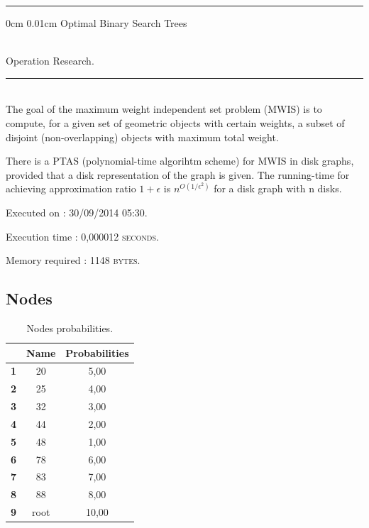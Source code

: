 \documentclass{article}
\makeatletter
\newcommand{\HRule}{\noindent\rule{\linewidth}{0.5mm}}
\renewcommand\section{\@startsection
  {section}{1}{0mm}%
  {0cm}%
  {0.01cm}%
  {\Huge\bfseries\color{black}}}%
\makeatother
\begin{document}
\HRule

\section{Optimal Binary Search Trees}

 \\[0.4cm]
{\LARGE Operation Research.}\\[0.4cm]
\HRule \\[0.5cm]
\indent The goal of the maximum weight independent set problem (MWIS) is to compute, for a given set of geometric objects with certain weights, a subset of disjoint (non-overlapping) objects with maximum total weight.

There is a PTAS (polynomial-time algorihtm scheme) for MWIS in disk graphs, provided that a disk representation of the graph is given. 
The running-time for achieving approximation ratio $1+\epsilon$ 
is $n^{O(1/\epsilon^{2})}$ for a disk graph with n disks.\\[0.5cm]
\begin{compactitem}
\item Executed on : \textsc{30/09/2014 05:30}. 
\item Execution time : \textsc{0,000012 seconds}. 
\item Memory required : \textsc{1148 bytes}. 
\end{compactitem}

\subsection{Nodes}
\begin{table}[!ht]
\centering
\begin{tabular}{c||c|c|}
\cline{2-3}
 & \cellcolor{gray90}\textbf{Name} & \cellcolor{gray90}\textbf{Probabilities}  \\
\hline\hline
\multicolumn{1}{|c||}{\cellcolor{gray90}\textbf{1}} & 20 & 5,00 \\ \hline
\multicolumn{1}{|c||}{\cellcolor{gray90}\textbf{2}} & 25 & 4,00 \\ \hline
\multicolumn{1}{|c||}{\cellcolor{gray90}\textbf{3}} & 32 & 3,00 \\ \hline
\multicolumn{1}{|c||}{\cellcolor{gray90}\textbf{4}} & 44 & 2,00 \\ \hline
\multicolumn{1}{|c||}{\cellcolor{gray90}\textbf{5}} & 48 & 1,00 \\ \hline
\multicolumn{1}{|c||}{\cellcolor{gray90}\textbf{6}} & 78 & 6,00 \\ \hline
\multicolumn{1}{|c||}{\cellcolor{gray90}\textbf{7}} & 83 & 7,00 \\ \hline
\multicolumn{1}{|c||}{\cellcolor{gray90}\textbf{8}} & 88 & 8,00 \\ \hline
\multicolumn{1}{|c||}{\cellcolor{gray90}\textbf{9}} & root & 10,00 \\ \hline
\end{tabular}
\caption{Nodes probabilities.}
\end{table}
\end{document}
